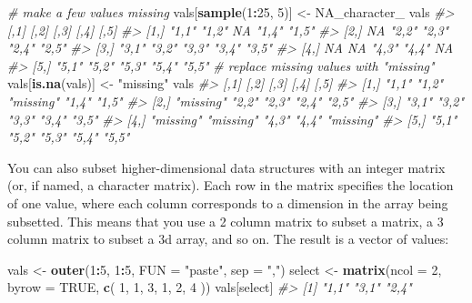 \documentclass[]{book}
\newenvironment{Shaded}{\begin{snugshade}}{\end{snugshade}}
\newcommand{\KeywordTok}[1]{\textcolor[rgb]{0.13,0.29,0.53}{\textbf{#1}}}
\newcommand{\DataTypeTok}[1]{\textcolor[rgb]{0.13,0.29,0.53}{#1}}
\newcommand{\DecValTok}[1]{\textcolor[rgb]{0.00,0.00,0.81}{#1}}
\newcommand{\StringTok}[1]{\textcolor[rgb]{0.31,0.60,0.02}{#1}}
\newcommand{\CommentTok}[1]{\textcolor[rgb]{0.56,0.35,0.01}{\textit{#1}}}
\newcommand{\OtherTok}[1]{\textcolor[rgb]{0.56,0.35,0.01}{#1}}
\newcommand{\OperatorTok}[1]{\textcolor[rgb]{0.81,0.36,0.00}{\textbf{#1}}}
\newcommand{\NormalTok}[1]{#1}
\theoremstyle{definition}
\theoremstyle{definition}
\theoremstyle{definition}
\theoremstyle{remark}
\begin{document}
\begin{Shaded}
\begin{Highlighting}[]
\CommentTok{# make a few values missing}
\NormalTok{vals[}\KeywordTok{sample}\NormalTok{(}\DecValTok{1}\OperatorTok{:}\DecValTok{25}\NormalTok{, }\DecValTok{5}\NormalTok{)] <-}\StringTok{ }\OtherTok{NA_character_}
\NormalTok{vals}
\CommentTok{#>      [,1]  [,2]  [,3]  [,4]  [,5] }
\CommentTok{#> [1,] "1,1" "1,2" NA    "1,4" "1,5"}
\CommentTok{#> [2,] NA    "2,2" "2,3" "2,4" "2,5"}
\CommentTok{#> [3,] "3,1" "3,2" "3,3" "3,4" "3,5"}
\CommentTok{#> [4,] NA    NA    "4,3" "4,4" NA   }
\CommentTok{#> [5,] "5,1" "5,2" "5,3" "5,4" "5,5"}
\CommentTok{# replace missing values with "missing"}
\NormalTok{vals[}\KeywordTok{is.na}\NormalTok{(vals)] <-}\StringTok{ "missing"}
\NormalTok{vals}
\CommentTok{#>      [,1]      [,2]      [,3]      [,4]  [,5]     }
\CommentTok{#> [1,] "1,1"     "1,2"     "missing" "1,4" "1,5"    }
\CommentTok{#> [2,] "missing" "2,2"     "2,3"     "2,4" "2,5"    }
\CommentTok{#> [3,] "3,1"     "3,2"     "3,3"     "3,4" "3,5"    }
\CommentTok{#> [4,] "missing" "missing" "4,3"     "4,4" "missing"}
\CommentTok{#> [5,] "5,1"     "5,2"     "5,3"     "5,4" "5,5"}
\end{Highlighting}
\end{Shaded}

You can also subset higher-dimensional data structures with an integer
matrix (or, if named, a character matrix). Each row in the matrix
specifies the location of one value, where each column corresponds to a
dimension in the array being subsetted. This means that you use a 2
column matrix to subset a matrix, a 3 column matrix to subset a 3d
array, and so on. The result is a vector of values:

\begin{Shaded}
\begin{Highlighting}[]
\NormalTok{vals <-}\StringTok{ }\KeywordTok{outer}\NormalTok{(}\DecValTok{1}\OperatorTok{:}\DecValTok{5}\NormalTok{, }\DecValTok{1}\OperatorTok{:}\DecValTok{5}\NormalTok{, }\DataTypeTok{FUN =} \StringTok{"paste"}\NormalTok{, }\DataTypeTok{sep =} \StringTok{","}\NormalTok{)}
\NormalTok{select <-}\StringTok{ }\KeywordTok{matrix}\NormalTok{(}\DataTypeTok{ncol =} \DecValTok{2}\NormalTok{, }\DataTypeTok{byrow =} \OtherTok{TRUE}\NormalTok{, }\KeywordTok{c}\NormalTok{(}
  \DecValTok{1}\NormalTok{, }\DecValTok{1}\NormalTok{,}
  \DecValTok{3}\NormalTok{, }\DecValTok{1}\NormalTok{,}
  \DecValTok{2}\NormalTok{, }\DecValTok{4}
\NormalTok{))}
\NormalTok{vals[select]}
\CommentTok{#> [1] "1,1" "3,1" "2,4"}
\end{Highlighting}
\end{Shaded}
\end{document}
